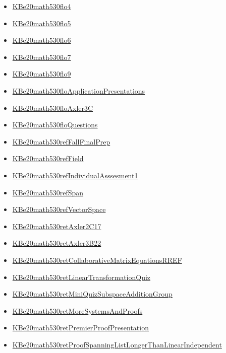 \documentclass[11pt]{article}
\begin{document}
\begin{itemize}
\begin{itemize}
\item \href{math530/KBe20math530flo4.org}{KBe20math530flo4}
\item \href{math530/KBe20math530flo5.org}{KBe20math530flo5}
\item \href{math530/KBe20math530flo6.org}{KBe20math530flo6}
\item \href{math530/KBe20math530flo7.org}{KBe20math530flo7}
\item \href{math530/KBe20math530flo9.org}{KBe20math530flo9}
\item \href{math530/KBe20math530floApplicationPresentations.org}{KBe20math530floApplicationPresentations}
\item \href{math530/KBe20math530floAxler3C.org}{KBe20math530floAxler3C}
\item \href{math530/KBe20math530floQuestions.org}{KBe20math530floQuestions}
\item \href{math530/KBe20math530refFallFinalPrep.org}{KBe20math530refFallFinalPrep}
\item \href{math530/KBe20math530refField.org}{KBe20math530refField}
\item \href{math530/KBe20math530refIndividualAsssesment1.org}{KBe20math530refIndividualAsssesment1}
\item \href{math530/KBe20math530refSpan.org}{KBe20math530refSpan}
\item \href{math530/KBe20math530refVectorSpace.org}{KBe20math530refVectorSpace}
\item \href{math530/KBe20math530retAxler2C17.org}{KBe20math530retAxler2C17}
\item \href{math530/KBe20math530retAxler3B22.org}{KBe20math530retAxler3B22}
\item \href{math530/KBe20math530retCollaborativeMatrixEquationsRREF.org}{KBe20math530retCollaborativeMatrixEquationsRREF}
\item \href{math530/KBe20math530retLinearTransformationQuiz.org}{KBe20math530retLinearTransformationQuiz}
\item \href{math530/KBe20math530retMiniQuizSubspaceAdditionGroup.org}{KBe20math530retMiniQuizSubspaceAdditionGroup}
\item \href{math530/KBe20math530retMoreSystemsAndProofs.org}{KBe20math530retMoreSystemsAndProofs}
\item \href{math530/KBe20math530retPremierProofPresentation.org}{KBe20math530retPremierProofPresentation}
\item \href{math530/KBe20math530retProofSpanningListLongerThanLinearIndependent.org}{KBe20math530retProofSpanningListLongerThanLinearIndependent}

\end{itemize}
\end{itemize}
\end{document}
